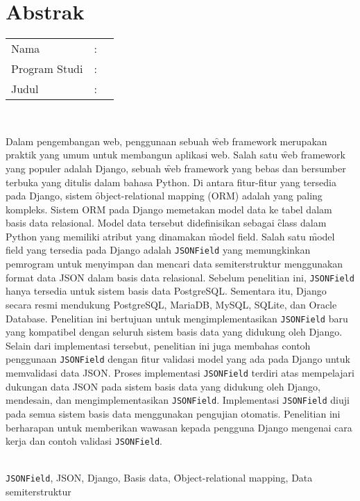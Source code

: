 %
%
%

\chapter*{Abstrak}
\singlespacing

\vspace*{0.2cm}

\noindent \begin{tabular}{@{}l l p{12.0cm}}
	Nama&: & \penulis \\
	Program Studi&: & \programIndonesia \\
	Judul&: & \judulIndonesia \\
\end{tabular} \\

\vspace*{0.5cm}

\noindent
Dalam pengembangan web, penggunaan sebuah \f{web framework} merupakan praktik
yang umum untuk membangun aplikasi web. Salah satu \f{web framework} yang
populer adalah Django, sebuah \f{web framework} yang bebas dan bersumber
terbuka yang ditulis dalam bahasa Python. Di antara fitur-fitur yang tersedia
pada Django, sistem \f{object-relational mapping} (ORM) adalah yang paling
kompleks. Sistem ORM pada Django memetakan model data ke tabel dalam basis data
relasional. Model data tersebut didefinisikan sebagai \f{class} dalam Python
yang memiliki atribut yang dinamakan \f{model field}. Salah satu \f{model
field} yang tersedia pada Django adalah \verb|JSONField| yang memungkinkan
pemrogram untuk menyimpan dan mencari data semiterstruktur menggunakan format
data JSON dalam basis data relasional. Sebelum penelitian ini, \verb|JSONField|
hanya tersedia untuk sistem basis data PostgreSQL. Sementara itu, Django secara
resmi mendukung PostgreSQL, MariaDB, MySQL, SQLite, dan Oracle Database.
Penelitian ini bertujuan untuk mengimplementasikan \verb|JSONField| baru yang
kompatibel dengan seluruh sistem basis data yang didukung oleh Django.
Selain dari implementasi tersebut, penelitian ini juga membahas contoh
penggunaan \verb|JSONField| dengan fitur validasi model yang ada pada Django
untuk memvalidasi data JSON. Proses implementasi \verb|JSONField| terdiri atas
mempelajari dukungan data JSON pada sistem basis data yang didukung oleh
Django, mendesain, dan mengimplementasikan \verb|JSONField|. Implementasi
\verb|JSONField| diuji pada semua sistem basis data menggunakan pengujian
otomatis. Penelitian ini berharapan untuk memberikan wawasan kepada pengguna
Django mengenai cara kerja dan contoh validasi \verb|JSONField|. \\

\vspace*{0.2cm}

\noindent {} \\
\verb|JSONField|, JSON, Django, Basis data, \f{Object-relational mapping}, Data
semiterstruktur \\

\onehalfspacing
\newpage
